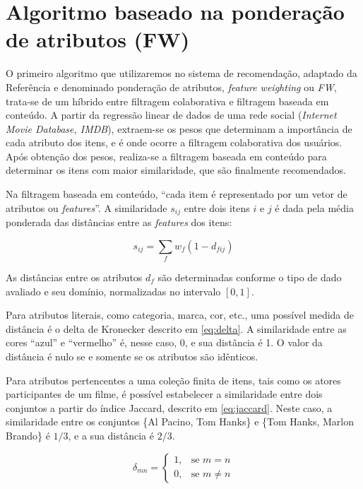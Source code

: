 \section{Algoritmo baseado na ponderação de atributos (FW)} %
\label{sec:algoritmo_baseado_na_pondera_o_de_atributos_}


O primeiro algoritmo que utilizaremos no sistema de recomendação, adaptado da Referência  e denominado ponderação de atributos, \textit{feature weighting} ou \textit{FW}, trata-se de um híbrido entre filtragem colaborativa e filtragem baseada em conteúdo. A partir da regressão linear de dados de uma rede social (\textit{Internet Movie Database, IMDB}), extraem-se os pesos que determinam a importância de cada atributo dos itens, e é onde ocorre a filtragem colaborativa dos usuários. Após obtenção dos pesos, realiza-se a filtragem baseada em conteúdo para determinar os itens com maior similaridade, que são finalmente recomendados.

Na filtragem baseada em conteúdo, ``cada item é representado por um vetor de atributos ou \textit{features}''. A similaridade $s_{ij}$ entre dois itens $i$ e $j$ é dada pela média ponderada das distâncias entre as \textit{features} dos itens:

\begin{equation} 
\label{eq:sij}
    s_{ij} = \sum_{f}{w_{f} \left(1-d_{fij}\right)}
\end{equation}

As distâncias entre os atributos $d_f$ são determinadas conforme o tipo de dado avaliado e seu domínio, normalizadas no intervalo $\left[0,1\right]$. 

Para atributos literais, como categoria, marca, cor, etc., uma possível medida de distância é o delta de Kronecker descrito em \ref{eq:delta}. A similaridade entre as cores ``azul'' e ``vermelho'' é, nesse caso, 0, e sua distância é 1. O valor da distância é nulo se e somente se os atributos são idênticos.

Para atributos pertencentes a uma coleção finita de itens, tais como os atores participantes de um filme, é possível estabelecer a similaridade entre dois conjuntos a partir do índice Jaccard, descrito em \ref{eq:jaccard}. Neste caso, a similaridade entre os conjuntos \{Al Pacino, Tom Hanks\} e \{Tom Hanks, Marlon Brando\} é $1/3$, e a sua distância é $2/3$.


\begin{equation}
\label{eq:delta}
\delta_{mn} =  
\begin{cases}
1, &\text{se }m=n \\
0, &\text{se }m \neq n
\end{cases} 
\end{equation}

